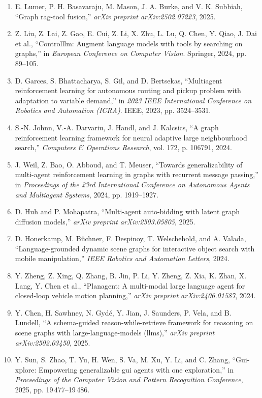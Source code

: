 \documentclass[10pt,UTF8,fontset=fandol]{ctexart}
\begin{document}
\begin{enumerate}[leftmargin=2.4em,labelsep=0.4em,itemsep=0.15em]
\item E. Lumer, P. H. Basavaraju, M. Mason, J. A. Burke, and V. K. Subbiah, ``Graph rag-tool fusion,'' \textit{arXiv preprint arXiv:2502.07223}, 2025.
\item Z. Liu, Z. Lai, Z. Gao, E. Cui, Z. Li, X. Zhu, L. Lu, Q. Chen, Y. Qiao, J. Dai et al., ``Controlllm: Augment language models with tools by searching on graphs,'' in \textit{European Conference on Computer Vision}. Springer, 2024, pp. 89--105.
\item D. Garces, S. Bhattacharya, S. Gil, and D. Bertsekas, ``Multiagent reinforcement learning for autonomous routing and pickup problem with adaptation to variable demand,'' in \textit{2023 IEEE International Conference on Robotics and Automation (ICRA)}. IEEE, 2023, pp. 3524--3531.
\item S.-N. Johnn, V.-A. Darvariu, J. Handl, and J. Kalcsics, ``A graph reinforcement learning framework for neural adaptive large neighbourhood search,'' \textit{Computers \& Operations Research}, vol. 172, p. 106791, 2024.
\item J. Weil, Z. Bao, O. Abboud, and T. Meuser, ``Towards generalizability of multi-agent reinforcement learning in graphs with recurrent message passing,'' in \textit{Proceedings of the 23rd International Conference on Autonomous Agents and Multiagent Systems}, 2024, pp. 1919--1927.
\item D. Huh and P. Mohapatra, ``Multi-agent auto-bidding with latent graph diffusion models,'' \textit{arXiv preprint arXiv:2503.05805}, 2025.
\item D. Honerkamp, M. Büchner, F. Despinoy, T. Welschehold, and A. Valada, ``Language-grounded dynamic scene graphs for interactive object search with mobile manipulation,'' \textit{IEEE Robotics and Automation Letters}, 2024.
\item Y. Zheng, Z. Xing, Q. Zhang, B. Jin, P. Li, Y. Zheng, Z. Xia, K. Zhan, X. Lang, Y. Chen et al., ``Planagent: A multi-modal large language agent for closed-loop vehicle motion planning,'' \textit{arXiv preprint arXiv:2406.01587}, 2024.
\item Y. Chen, H. Sawhney, N. Gydé, Y. Jian, J. Saunders, P. Vela, and B. Lundell, ``A schema-guided reason-while-retrieve framework for reasoning on scene graphs with large-language-models (llms),'' \textit{arXiv preprint arXiv:2502.03450}, 2025.
\item Y. Sun, S. Zhao, T. Yu, H. Wen, S. Va, M. Xu, Y. Li, and C. Zhang, ``Gui-xplore: Empowering generalizable gui agents with one exploration,'' in \textit{Proceedings of the Computer Vision and Pattern Recognition Conference}, 2025, pp. 19\,477--19\,486.

\end{enumerate}
\end{document}
